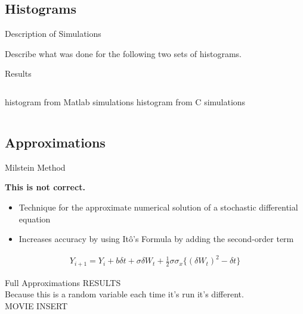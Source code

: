 
\subsection{Histograms}

\begin{frame}{Description of Simulations}

  Describe what was done for the following two sets of histograms.

\end{frame}


\begin{frame}{Results}
 

  \begin{columns}[t]
    histogram from Matlab simulations
    histogram from C simulations
  \end{columns}


\end{frame}



\subsection{Approximations}

\begin{frame}{Milstein Method}

    \textbf{This is not correct.}

	\begin{itemize}
		\item Technique for the approximate numerical solution of a stochastic differential equation
		\item Increases accuracy by using It\^o's Formula by adding the second-order term
	\end{itemize} 

	\begin{align*}
		Y_{i+1} = Y_i +b\delta t + \sigma \delta W_t + \frac{1}{2} \sigma \sigma_x \{(\delta W_t)^2 - \delta t\} 
	\end{align*}

\end{frame}

\begin{frame}{Full Approximations}
RESULTS \\
Because this is a random variable each time it's run it's different. \\
MOVIE INSERT 
\end{frame}

